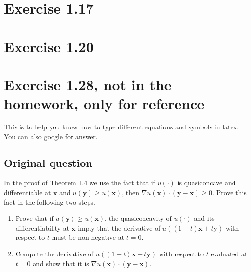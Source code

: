 \documentclass[a4paper,11pt,american]{article}
\newcommand{\xx}{\mathbf{x}}
\begin{document}
\section{Exercise 1.17}%

\section{Exercise 1.20}

\section{Exercise 1.28, not in the homework, only for reference}
This is to help you know how to type different equations and symbols in latex. You can also google for answer.
\subsection{Original question}
In the proof of Theorem 1.4 we use the fact that if $u(\cdot)$ is quasiconcave and differentiable at $\xx$ and $u(\mathbf{y}) \geq u(\xx)$, then $\nabla u(\xx) \cdot (\mathbf{y} - \xx) \geq 0$. Prove this fact in the following two steps.
\begin{enumerate}[label = \alph*)]
\item Prove that if $u(\mathbf{y}) \geq u(\xx)$, the quasiconcavity of $u(\cdot)$ and its differentiability at $\xx$ imply that the derivative of $u((1 - t) \xx + t \mathbf{y})$ with respect to $t$ must be non-negative at $t = 0$.
\item Compute the derivative of $u((1 - t) \xx + t \mathbf{y})$ with respect to $t$ evaluated at $t = 0$ and show that it is $\nabla u(\xx) \cdot (\mathbf{y} - \xx)$.
\end{enumerate}
\end{document}
